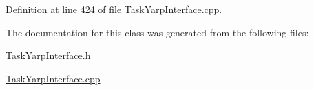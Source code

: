 Definition at line 424 of file Task\+Yarp\+Interface.\+cpp.



The documentation for this class was generated from the following files\+:\begin{DoxyCompactItemize}
\item 
\hyperlink{TaskYarpInterface_8h}{Task\+Yarp\+Interface.\+h}\item 
\hyperlink{TaskYarpInterface_8cpp}{Task\+Yarp\+Interface.\+cpp}\end{DoxyCompactItemize}

